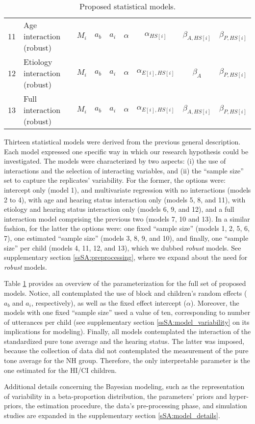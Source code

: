 \begin{table}[h!]
\begin{tabular}{|c|lccccccc|}
		11 & Age interaction (robust) & $M_{i}$ & $a_{b}$ & $a_{i}$ & $\alpha$ & $\alpha_{HS[i]}$ & $\beta_{A, HS[i]}$ & $\beta_{P, HS[i]}$ \\
		12 & Etiology interaction (robust) & $M_{i}$ & $a_{b}$ & $a_{i}$ & $\alpha$ & $\alpha_{E[i],HS[i]}$ & $\beta_{A}$ & $\beta_{P, HS[i]}$ \\
		\rowcolor{gray}
		13 & Full interaction (robust) & $M_{i}$ & $a_{b}$ & $a_{i}$ & $\alpha$ & $\alpha_{E[i],HS[i]}$ & $\beta_{A, HS[i]}$ & $\beta_{P, HS[i]}$ \\
		\hline
	\end{tabular}
	\caption[Proposed statistical models]{Proposed statistical models.}
	\label{tab:models}
\end{table}

Thirteen statistical models were derived from the previous general description. Each model expressed one specific way in which our research hypothesis could be investigated. The models were characterized by two aspects: (i) the use of interactions and the selection of interacting variables, and (ii) the ``sample size'' set to capture the replicates' variability. For the former, the options were: intercept only (model 1), and multivariate regression with no interactions (models 2 to 4), with age and hearing status interaction only (models 5, 8, and 11), with etiology and hearing status interaction only (models 6, 9, and 12), and a full interaction model comprising the previous two (models 7, 10 and 13). In a similar fashion, for the latter the options were: one fixed ``sample size'' (models 1, 2, 5, 6, 7), one estimated ``sample size'' (models 3, 8, 9, and 10), and finally, one ``sample size'' per child (models 4, 11, 12, and 13), which we dubbed \textit{robust} models. See supplementary section \ref{ssSA:preprocessing}, where we expand about the need for \textit{robust} models. 

Table \ref{tab:models} provides an overview of the parameterization for the full set of proposed models. Notice, all contemplated the use of block and children's random effects ($a_{b}$ and $a_{i}$, respectively), as well as the fixed effect intercept ($\alpha$). Moreover, the models with one fixed ``sample size'' used a value of ten, corresponding to number of utterances per child (see supplementary section \ref{ssSA:model_variability} on its implications for modeling). Finally, all models contemplated the interaction of the standardized pure tone average and the hearing status. The latter was imposed, because the collection of data did not contemplated the measurement of the pure tone average for the NH group. Therefore, the only interpretable parameter is the one estimated for the HI/CI children.

Additional details concerning the Bayesian modeling, such as the representation of variability in a beta-proportion distribution, the parameters' priors and hyper-priors, the estimation procedure, the data's pre-processing phase, and simulation studies are expanded in the supplementary section \ref{sSA:model_details}.
%
%
